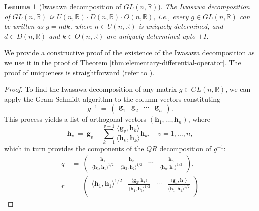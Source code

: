 \documentclass[12pt, reqno, oneside]{amsart}
\newtheorem{lemma}[corollary]{Lemma}
\numberwithin{equation}{section}
\begin{document}
\begin{lemma}[Iwasawa decomposition of $GL(n,\mathbb{R})$]\label{lemma:Iwasawa}
The Iwasawa decomposition of $GL(n,\mathbb{R})$ is
$U(n,\mathbb{R}) \cdot D(n,\mathbb{R}) \cdot O(n,\mathbb{R})$, i.e., every $g \in GL(n,\mathbb{R})$ can be written as $g = n d k$, where $n \in U(n,\mathbb{R})$ is uniquely determined, and $d \in D(n,\mathbb{R})$ and $k \in O(n,\mathbb{R})$ are uniquely determined upto $\pm I$.
\end{lemma}

We provide a constructive proof of the existence of the Iwasawa decomposition as we use it in the proof of Theorem \ref{thm:elementary-differential-operator}. The proof of uniqueness is straightforward (refer to \cite[Proposition 1.2.6]{Gol06}).

\begin{proof}
To find the Iwasawa decomposition of any matrix $g \in GL(n,\mathbb{R})$, we can apply the Gram-Schmidt algorithm to the column vectors constituting 
\begin{equation}
g^{-1} \ = \
\begin{pmatrix}
    \mathbf{g}_1 & \mathbf{g}_2 & \cdots & \mathbf{g}_n
\end{pmatrix}.
\end{equation}
This process yields a list of orthogonal vectors $(\mathbf{h}_1,\ldots,\mathbf{h}_n)$, where 
\begin{equation}\label{eq:gram_schmidt_general}
    \mathbf{h}_v \ = \ \mathbf{g}_v - \sum_{k=1}^{v-1}\frac{\langle \mathbf{g}_v, \mathbf{h}_k \rangle}{\langle \mathbf{h}_k, \mathbf{h}_k\rangle}\mathbf{h}_k, \quad v=1,\dots,n,
\end{equation}
which in turn provides the components of the $QR$ decomposition of $g^{-1}$:
\begin{align} \label{eq:iwasawa-orthogonal}
q \ &= \
\begin{pmatrix}
    \frac{\mathbf{h}_1}{\langle \mathbf{h}_1, \mathbf{h}_1 \rangle^{1/2}} & \frac{\mathbf{h}_2}{\langle \mathbf{h}_2, \mathbf{h}_2 \rangle^{1/2}} & \cdots & \frac{\mathbf{h}_n}{\langle \mathbf{h}_n, \mathbf{h}_n \rangle^{1/2}}
\end{pmatrix}, \\
\label{eq:iwasawa-upper-triangular}
r \ &= \ 
\begin{pmatrix}
    \langle \mathbf{h}_1, \mathbf{h}_1 \rangle^{1/2} & \frac{\langle \mathbf{g}_2, \mathbf{h}_1 \rangle}{\langle \mathbf{h}_1, \mathbf{h}_1 \rangle^{1/2}} & \cdots & \frac{\langle \mathbf{g}_n, \mathbf{h}_1 \rangle}{\langle \mathbf{h}_1, \mathbf{h}_1 \rangle^{1/2}} \\

\end{pmatrix}
\end{align}
\end{proof}
\end{document}
